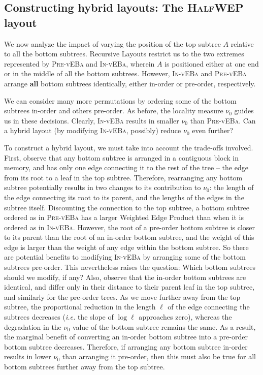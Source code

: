 \documentclass[10pt,conference,letterpaper]{IEEEtran}
\newcommand{\note}[1]{}
\newcommand{\comment}[1]{}
\newcommand{\HLs}{Hierarchical Layouts\xspace}
\newcommand{\RLs}{Recursive Layouts\xspace}
\newcommand{\pvla}{\textsc{Pre-vEBa}\xspace}
\newcommand{\ivla}{\textsc{In-vEBa}\xspace}
\newcommand{\WEP}{Weighted Edge Product\xspace}
\newcommand{\ie}{{\it i.e.}\xspace}
\newcommand{\pwmean}[1][p]{\ensuremath{\nu_{#1}}\xspace}
\newcommand{\halfwep}{\textsc{HalfWEP}\xspace}
\newcommand{\len}[1][]{\ensuremath{\ell_{#1}}\xspace}
\begin{document}
\subsection{Constructing hybrid layouts: The \halfwep layout} 

\comment{A more critical question remains: What should be the position of}
We now analyze the impact of varying the position of the top subtree $A$ relative to all the bottom subtrees.
\RLs restrict us to the two extremes represented by \pvla and \ivla, wherein $A$ is positioned either at one end or in the middle of all the bottom subtrees. However, \ivla and \pvla arrange \textbf{all} bottom subtrees identically, 
either in-order or pre-order, respectively. 
\note{We need to make it clear that pre-order means both pre- and post-order depending on context. Added text in the definition pf \HLs.}
We can consider many more permutations by ordering some of the bottom subtrees in-order and others pre-order. As before, 
the locality measure \pwmean[0] guides us in these decisions. Clearly, \ivla results in smaller \pwmean[0] than \pvla. 
Can a hybrid layout (by modifying \ivla, possibly) reduce \pwmean[0] even further? 

To construct a hybrid layout, we must take into account the trade-offs involved. First, observe that any bottom subtree is arranged in a contiguous block in memory, and has only one edge connecting it to the rest of the tree -- the edge from its root to a leaf in the top subtree. Therefore, rearranging any bottom subtree potentially results in two changes to its contribution to \pwmean[0]: the length of the edge connecting its root to its parent, and the lengths of the edges in the subtree itself. Discounting the connection to the top subtree, a bottom subtree ordered as in \pvla has a larger \WEP than when it is ordered as in \ivla. However, the root of a pre-order bottom subtree is closer to its parent than the root of an in-order bottom subtree, and the weight of this edge is larger than the weight of any edge within the bottom subtree. So there are potential benefits to modifying \ivla by arranging some of the bottom subtrees pre-order. This nevertheless raises the question: Which bottom subtrees should we modify, if any? Also, observe that the in-order bottom subtrees are identical, and differ only in their distance to their parent leaf in the top subtree, and similarly for the pre-order trees.
As we move further away from the top subtree, the proportional reduction in the length \len of the edge connecting the subtrees decreases (\ie the slope of $\log \len$ approaches zero), whereas the degradation in the \pwmean[0] value of the bottom subtree remains the same. As a result,
the marginal benefit of converting an in-order bottom subtree into a pre-order bottom subtree decreases. Therefore, if arranging any bottom subtree in-order results in lower \pwmean[0] than arranging it pre-order, then this must also be true for all bottom subtrees further away from the top subtree.
\end{document}

